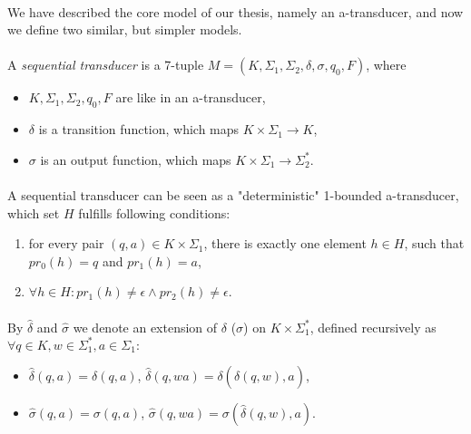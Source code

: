 \paragraph{}
We have described the core model of our thesis, namely an a-transducer, and now we define two similar, but simpler models.

\paragraph{}
 A \emph{sequential transducer} is a 7-tuple $M=(K, \Sigma_{1}, \Sigma_{2}, \delta, \sigma, q_{0}, F)$, where
\begin{itemize} 
\item $K, \Sigma_{1}, \Sigma_{2}, q_{0}, F$ are like in an a-transducer,
\item $\delta $ is a transition function, which maps $K \times \Sigma_{1} \rightarrow K$,
\item $\sigma $ is an output function, which maps $K \times \Sigma_{1} \rightarrow \Sigma_{2}^{*} $.
\end{itemize}

\paragraph{} 
A sequential transducer can be seen as a "deterministic" 1-bounded a-transducer, which set $H$ fulfills following conditions:
\begin{enumerate}
\item for every pair $(q, a) \in K \times \Sigma_{1}$, there is exactly one element $h \in H$, such that $pr_{0}(h) = q$ and $pr_{1}(h) = a$,
\item $\forall h \in H: pr_{1}(h) \neq \epsilon \wedge pr_{2}(h) \neq \epsilon $.
\end{enumerate}

\paragraph{}
\oznacenie By $\hat{\delta}$ and $\hat{\sigma}$ we denote an extension of $\delta $ ($\sigma $) on $K \times \Sigma_{1}^{*} $, defined recursively as \\
$\forall q \in K, w \in \Sigma_{1}^{*}, a \in \Sigma_{1}:$ \\
\begin{itemize} 
\item $\hat{\delta}(q, a) = \delta (q,a)$, $\hat{\delta}(q,wa) = \delta (\hat{\delta}(q, w), a)$,
\item $\hat{\sigma}(q, a) = \sigma (q,a)$, $\hat{\sigma}(q,wa) = \sigma (\hat{\delta}(q, w), a)$.
\end{itemize}

